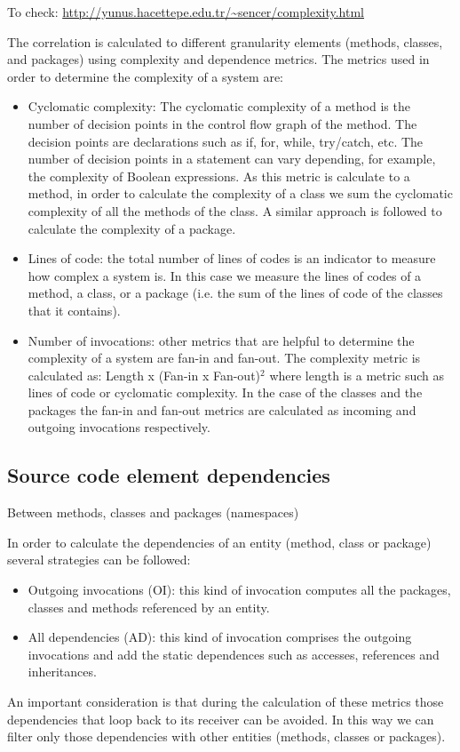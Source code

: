 \documentclass{sig-alternate}
\begin{document}
To check: \url{http://yunus.hacettepe.edu.tr/~sencer/complexity.html}


The correlation is calculated to different granularity elements (methods, classes, and packages) using complexity and dependence metrics. The metrics used in order to determine the complexity of a system are:
\begin{itemize}%
\item Cyclomatic complexity: The cyclomatic complexity of a method is the number of decision points in the control flow graph of the method. The decision points are declarations such as if, for, while, try/catch, etc. The number of decision points in a statement can vary depending, for example, the complexity of Boolean expressions. As this metric is calculate to a method, in order to calculate the complexity of a class we sum the cyclomatic complexity of all the methods of the class. A similar approach is followed to calculate the complexity of a package. 
\item Lines of code: the total number of lines of codes is an indicator to measure how complex a system is. In this case we measure the lines of codes of a method, a class, or a package (i.e. the sum of the lines of code of the classes that it contains).
\item Number of invocations: other metrics that are helpful to determine the complexity of a system are fan-in and fan-out. The complexity metric is calculated as: Length x (Fan-in x Fan-out)$^{2}$ where length is a metric such as lines of code or cyclomatic complexity. In the case of the classes and the packages the fan-in and fan-out metrics are calculated as incoming and outgoing invocations respectively.
\end{itemize}
\subsection{Source code element dependencies}

Between methods, classes and packages (namespaces)

In order to calculate the dependencies of an entity (method, class or package) several strategies can be followed:
\begin{itemize}
\item Outgoing invocations (OI): this kind of invocation computes all the packages, classes and methods referenced by an entity. 
\item All dependencies (AD): this kind of invocation comprises the outgoing invocations and add the static dependences such as accesses, references and inheritances.
\end{itemize}
An important consideration is that during the calculation of these metrics those dependencies that loop back to its receiver can be avoided. In this way we can filter only those dependencies with other entities (methods, classes or packages).
\end{document}
